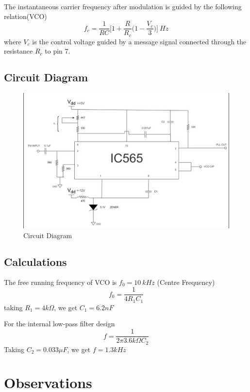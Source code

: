 \documentclass{article}
\begin{document}
The instantaneous carrier frequency after modulation is guided by the following relation(VCO)
\begin{equation}
  f_c=\frac{1}{RC}\Big[1+\frac{R}{R_c}\Big(1-\frac{V_c}{3}\Big)\Big] \ Hz
\end{equation}
where $V_c$ is the control voltage guided by a message signal connected through the resistance $R_c$ to pin 7.

\subsection{Circuit Diagram}
\begin{figure}[!ht]
\includegraphics[width=\textwidth]{Circuit.png}
\caption{Circuit Diagram}
\label{fig:cir}
\end{figure}
\clearpage
\subsection{Calculations}
The free running frequency of VCO is $f_0 = 10 \ kHz$ (Centre Frequency)
\begin{equation}
    f_0=\frac{1}{4R_1C_1}
\end{equation}
taking $R_1=4k\Omega$, we get $C_1=6.2nF$

For the internal low-pass filter design
\begin{equation}
    f=\frac{1}{2 \pi 3.6 k\Omega C_2}
\end{equation}
Taking $C_2=0.033\mu F$, we get $f=1.3 kHz$
\section{Observations}
\end{document}
